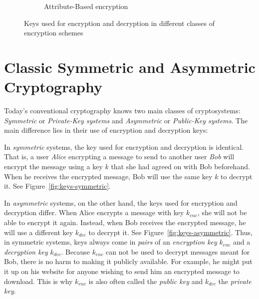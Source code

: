 \begin{figure}
\begin{subfigure}{.7\textwidth}
        \caption{Attribute-Based encryption} \label{fig:keys-abe}
    \end{subfigure}
    \caption[Keys in different classes of encryption schemes]{Keys used for encryption and decryption in different classes of encryption schemes}
\end{figure}

\section{Classic Symmetric and Asymmetric Cryptography}
Today's conventional cryptography knows two main classes of cryptosystems: \emph{Symmetric} or \emph{Private-Key systems} and \emph{Asymmetric} or \emph{Public-Key systems}.
The main difference lies in their use of encryption and decryption keys:

In \emph{symmetric} systems, the key used for encryption and decryption is identical.
That is, a user \emph{Alice} encrypting a message to send to another user \emph{Bob} will encrypt the message using a key $k$ that she had agreed on with Bob beforehand.
When he receives the encrypted message, Bob will use the same key $k$ to decrypt it. See Figure~\ref{fig:keys-symmetric}.

In \emph{asymmetric} systems, on the other hand, the keys used for encryption and decryption differ.
When Alice encrypts a message with key $k_{enc}$, she will not be able to encrypt it again.
Instead, when Bob receives the encrypted message, he will use a different key $k_{dec}$ to decrypt it. See Figure~\ref{fig:keys-asymmetric}.
Thus, in symmetric systems, keys always come in \emph{pairs} of an \emph{encryption key} $k_{enc}$ and a \emph{decryption key} $k_{dec}$.
Because $k_{enc}$ can not be used to decrypt messages meant for Bob, there is no harm to making it publicly available.
For example, he might put it up on his website for anyone wishing to send him an encrypted message to download. This is why $k_{enc}$ is also often called the \emph{public key} and $k_{dec}$ the \emph{private key}.

